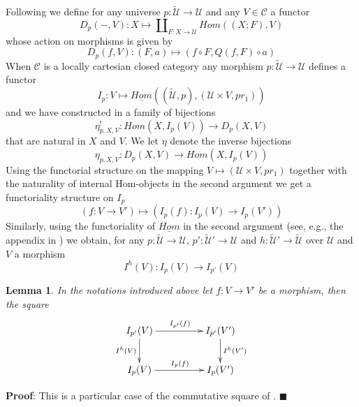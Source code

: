 \documentclass[12pt]{article}
\numberwithin{equation}{section}
\newenvironment{myproof}{{\bf Proof}:}{$\blacksquare$ \vskip 5mm }
\newtheorem{lemma}[proposition]{Lemma}
\newcommand{\llabel}[1]{\label{#1}}
\newcommand{\sr}{\rightarrow}
\newcommand{\uu}{\underline}
\newcommand{\iHom}{\uu{Hom}}
\newcommand{\wt}{\widetilde}
\newcommand{\U}{\mathcal{U}}
\begin{document}
Following \cite{fromunivwithPi} we define for any universe $p:\wt{\U}\sr \U$ and
any $V\in {\mathcal C}$ a functor
%
$$D_p(-,V):X\mapsto \amalg_{F:X\sr \U}Hom((X;F), V)$$
%
whose action on morphisms is given by
%
$$D_p(f,V):(F,a)\mapsto (f\circ F, Q(f,F)\circ a)$$
%
When $\mathcal C$ is a locally cartesian closed category any morphism
$p:\wt{\U}\sr \U$ defines a functor
%
$$I_p:V\mapsto \iHom((\wt{\U},p),(\U\times V,pr_1))$$
%
and we have constructed in \cite[Construction 3.9]{fromunivwithPi} a family of
bijections
%
$$\eta^!_{p,X,V}:Hom(X,I_p(V))\sr D_p(X,V)$$
%
that are natural in $X$ and $V$. We let $\eta$ denote the inverse bijections
%
$$\eta_{p,X,V}:D_p(X,V)\sr Hom(X,I_p(V))$$
%
Using the functorial structure on the mapping $V\mapsto (\U\times V,pr_1)$
together with the naturality of internal Hom-objects in the second argument we
get a functoriality structure on $I_p$
%
$$(f:V\sr V')\mapsto (I_p(f):I_p(V)\sr I_p(V'))$$
%
Similarly, using the functoriality of $\iHom$ in the second argument (see,
e.g., the appendix in \cite{fromunivwithPi}) we obtain, for any $p:\wt{\U}\sr \U$,
$p':\wt{\U}'\sr \U$ and $h:\wt{\U}'\sr \wt{\U}$ over $\U$ and $V$ a morphism
%
$$I^h(V):I_p(V)\sr I_{p'}(V)$$
%
\begin{lemma}
\llabel{2015.04.10.l2} In the notations introduced above let $f:V\sr V'$ be a
morphism, then the square
%
$$
\begin{xy}
          \xymatrix@C=4pc{ I_{p'}(V) \ar[r]^{I_{p'}(f)} \ar[d]_{I^h(V)} &
            I_{p'}(V') \ar[d]^{I^h(V')}\\ I_p(V) \ar[r]^{I_p(f)} & I_p(V') }
\end{xy}
$$
\end{lemma}
%
\begin{myproof}
This is a particular case of the commutative square of \cite[Lemma
  8.5]{fromunivwithPi}.
\end{myproof}
\end{document}
